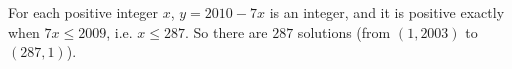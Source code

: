 For each positive integer $x$, $y=2010-7x$ is an integer, and it is positive exactly when $7x\le2009$, i.e. $x\le287$. So there are $\boxed{287}$ solutions (from $(1,2003)$ to $(287,1)$).
